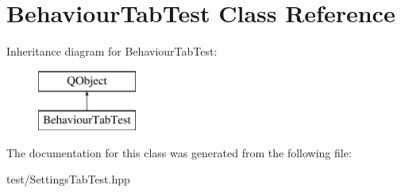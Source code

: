 \hypertarget{classBehaviourTabTest}{\section{Behaviour\+Tab\+Test Class Reference}
\label{classBehaviourTabTest}
}
Inheritance diagram for Behaviour\+Tab\+Test\+:\begin{figure}[H]
\begin{center}
\leavevmode
\includegraphics[height=2.000000cm]{classBehaviourTabTest}
\end{center}
\end{figure}


The documentation for this class was generated from the following file\+:\begin{DoxyCompactItemize}
\item 
test/Settings\+Tab\+Test.\+hpp\end{DoxyCompactItemize}
